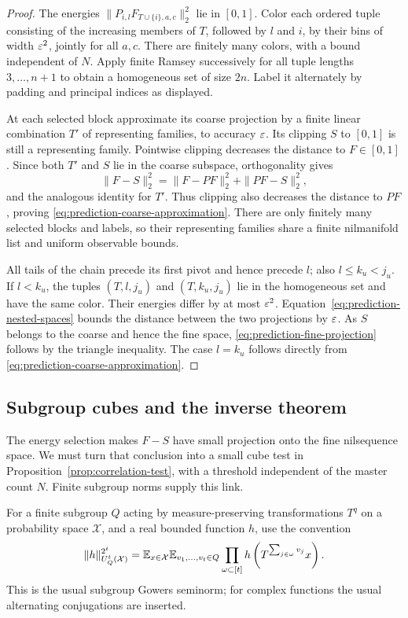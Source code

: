 \begin{proof}
The energies $\|P_{i,l}F_{T\cup\{i\},a,c}\|_2^2$ lie in $[0,1]$.
Color each ordered tuple consisting of the increasing members of
$T$, followed by $l$ and $i$, by their bins of width $\varepsilon^2$,
jointly for all $a,c$.  There are finitely many colors, with a bound
independent of $N$.  Apply finite Ramsey successively for all tuple
lengths $3,\ldots,n+1$ to obtain a homogeneous set of size $2n$.
Label it alternately by padding and principal indices as displayed.

At each selected block approximate its coarse projection by a finite
linear combination $T'$ of representing families, to accuracy $\varepsilon$.
Its clipping $S$ to $[0,1]$ is still a representing family.  Pointwise
clipping decreases the distance to $F\in[0,1]$.  Since both $T'$ and
$S$ lie in the coarse subspace, orthogonality gives
\[
 \|F-S\|_2^2=\|F-PF\|_2^2+\|PF-S\|_2^2,
\]
and the analogous identity for $T'$.  Thus clipping also decreases
the distance to $PF$, proving
\eqref{eq:prediction-coarse-approximation}.  There are only finitely
many selected blocks and labels, so their representing families
share a finite nilmanifold list and uniform observable bounds.

All tails of the chain precede its first pivot and hence precede
$l$; also $l\leq k_u<j_u$.  If $l<k_u$, the tuples $(T,l,j_u)$ and
$(T,k_u,j_u)$ lie in the homogeneous set and have the same color.
Their energies differ by at most $\varepsilon^2$.
Equation~\eqref{eq:prediction-nested-spaces} bounds the distance
between the two projections by $\varepsilon$.  As $S$ belongs to the coarse
and hence the fine space, \eqref{eq:prediction-fine-projection}
follows by the triangle inequality.  The case $l=k_u$ follows
directly from \eqref{eq:prediction-coarse-approximation}.
\end{proof}

\subsection{Subgroup cubes and the inverse theorem}

The energy selection makes $F-S$ have small projection onto the fine
nilsequence space.  We must turn that conclusion into a small cube test
in Proposition~\ref{prop:correlation-test}, with a threshold independent
of the master count $N$.  Finite subgroup norms supply this link.

For a finite subgroup $Q$ acting by measure-preserving transformations
$T^q$ on a probability space $\mathcal X$, and a real bounded function
$h$, use the convention
\[
 \|h\|_{U^t_Q(\mathcal X)}^{2^t}
 =\mathbb E_{x\in\mathcal X}\mathbb E_{v_1,\ldots,v_t\in Q}
 \prod_{\omega\subset[t]}h\left(T^{\sum_{j\in\omega}v_j}x\right).
\]
This is the usual subgroup Gowers seminorm; for complex functions the
usual alternating conjugations are inserted.

